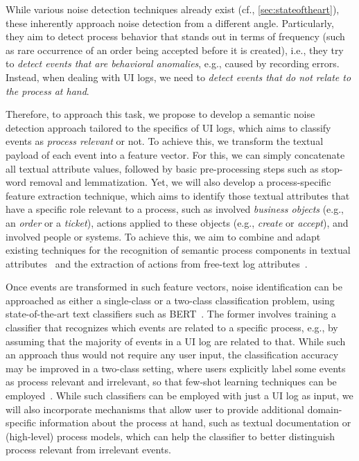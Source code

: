 While various noise detection techniques already exist (cf., \autoref{sec:stateoftheart}), these  inherently approach noise detection from a different angle. Particularly, they aim to detect process behavior that stands out in terms of frequency (such as rare occurrence of an order being accepted before it is created), i.e., they try to \emph{detect events that are behavioral anomalies}, e.g., caused by recording errors.
Instead, when dealing with UI logs, we need to \emph{detect events that do not relate to the process at hand}. 

Therefore, to approach this task, we propose to develop a semantic noise detection approach tailored to the specifics of UI logs, which aims to classify events as \emph{process relevant} or not. 
To achieve this, we transform the textual payload of each event into a feature vector.
For this, we can simply concatenate all textual attribute values, followed by basic pre-processing steps such as stop-word removal and lemmatization. Yet, we will also develop a process-specific feature extraction technique, which aims to identify those textual attributes that have a specific role relevant to a process, such as involved \emph{business objects} (e.g., an \emph{order} or a \emph{ticket}), actions applied to these objects (e.g., \emph{create} or \emph{accept}), and involved people or systems. To achieve this, we aim to combine and adapt existing techniques for the recognition of semantic process components in textual attributes~\cite{rebmann2021extracting} and the extraction of actions from free-text log attributes~\cite{gupta2020analyzing}. 

Once events are transformed in such feature vectors, noise identification can be approached as either a single-class or a two-class classification problem, using state-of-the-art text classifiers such as BERT~\cite{Devlin2019}. The former involves training a classifier that recognizes which events are related to a specific process, e.g., by assuming that the majority of events in a UI log are related to that. While such an approach thus would not require any user input, the classification accuracy may be improved in a two-class setting, where users explicitly label some events as process relevant and irrelevant, so that few-shot learning techniques can be employed~\cite{yu2018diverse}.
While such classifiers can be employed with just a UI log as input, we will also incorporate mechanisms that allow user to provide additional domain-specific information about the process at hand, such as textual documentation or (high-level) process models, which can help the classifier to better distinguish process relevant from irrelevant events.

